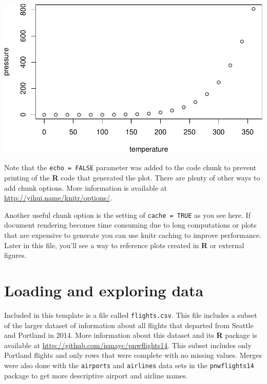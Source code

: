 \documentclass[12pt,twoside]{reedthesis}
\begin{document}
  \begin{center}\includegraphics{tesis_files/figure-latex/pressure-1} \end{center}
  
  Note that the \texttt{echo\ =\ FALSE} parameter was added to the code
  chunk to prevent printing of the \textbf{R} code that generated the
  plot. There are plenty of other ways to add chunk options. More
  information is available at \url{http://yihui.name/knitr/options/}.
  
  Another useful chunk option is the setting of \texttt{cache\ =\ TRUE} as
  you see here. If document rendering becomes time consuming due to long
  computations or plots that are expensive to generate you can use knitr
  caching to improve performance. Later in this file, you'll see a way to
  reference plots created in \textbf{R} or external figures.
  
  \hypertarget{loading-and-exploring-data}{\section{Loading and exploring
  data}\label{loading-and-exploring-data}}
  
  Included in this template is a file called \texttt{flights.csv}. This
  file includes a subset of the larger dataset of information about all
  flights that departed from Seattle and Portland in 2014. More
  information about this dataset and its \textbf{R} package is available
  at \url{http://github.com/ismayc/pnwflights14}. This subset includes
  only Portland flights and only rows that were complete with no missing
  values. Merges were also done with the \texttt{airports} and
  \texttt{airlines} data sets in the \texttt{pnwflights14} package to get
  more descriptive airport and airline names.
  
\end{document}
